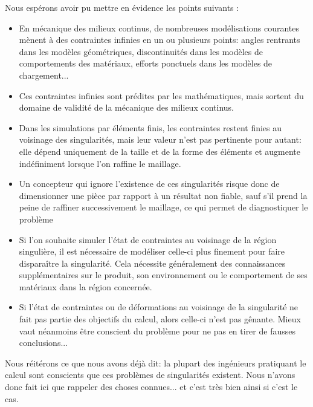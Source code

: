 Nous espérons avoir pu mettre en évidence les points suivants :
\begin{itemize}
   \item En mécanique des milieux continus, de nombreuses modélisations courantes mènent à des
	contraintes infinies en un ou plusieurs points: angles rentrants dans les modèles
	géométriques, discontinuités dans les modèles de comportements des matériaux, efforts
	ponctuels dans les modèles de chargement...
   \item Ces contraintes infinies sont prédites par les mathématiques, mais sortent du domaine de
	validité de la mécanique des milieux continus.
   \item Dans les simulations par éléments finis, les contraintes restent finies au voisinage des
	singularités, mais leur valeur n'est pas pertinente pour autant: elle dépend uniquement
	de la taille et de la forme des éléments et augmente indéfiniment lorsque l'on raffine le
	maillage.
   \item Un concepteur qui ignore l'existence de ces singularités risque donc de dimensionner une
	pièce par rapport à un résultat non fiable, sauf s'il prend la peine de raffiner
	successivement le maillage, ce qui permet de diagnostiquer le problème 
   \item Si l'on souhaite simuler l'état de contraintes au voisinage de la région singulière, il est
	nécessaire de modéliser celle-ci plus finement pour faire disparaître la singularité. Cela
	nécessite généralement des connaissances supplémentaires sur le produit, son
	environnement ou le comportement de ses matériaux dans la région concernée.
   \item Si l'état de contraintes ou de déformations au voisinage de la singularité ne fait pas
	partie des objectifs du calcul, alors celle-ci n'est pas gênante. Mieux vaut néanmoins être
	conscient du problème pour ne pas en tirer de fausses conclusions...
\end{itemize}

\medskip
Nous réitérons ce que nous avons déjà dit: la plupart des ingénieurs pratiquant le calcul
sont conscients que ces problèmes de singularités existent. Nous n'avons donc fait ici que
rappeler des choses connues... et c'est très bien ainsi si c'est le cas.













